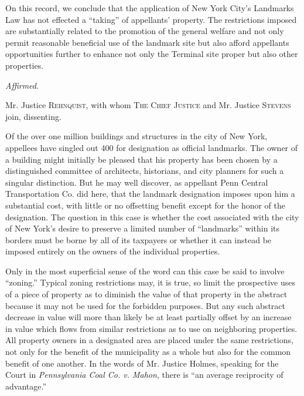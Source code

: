 %
On this record, we conclude that the application of New York City's Landmarks
Law has not effected a ``taking'' of appellants' property. The restrictions
imposed are substantially related to the promotion of the general welfare and
not only permit reasonable beneficial use of the landmark site but also afford
appellants opportunities further to enhance not only the Terminal site proper
but also other properties.

\textit{Affirmed}.

\opinion Mr. Justice \textsc{Rehnquist}, with whom \textsc{The Chief Justice}
and Mr. Justice \textsc{Stevens} join, dissenting.

Of the over one million buildings and structures in the city of New York,
appellees have singled out 400 for designation as official landmarks. The owner
of a building might initially be pleased that his property has been chosen by a
distinguished committee of architects, historians, and city planners for such a
singular distinction. But he may well discover, as appellant Penn Central
Transportation Co. did here, that the landmark designation imposes upon him a
substantial cost, with little or no offsetting benefit except for the honor of
the designation. The question in this case is whether the cost associated with
the city of New York's desire to preserve a limited number of ``landmarks''
within its borders must be borne by all of its taxpayers or whether it can
instead be imposed entirely on the owners of the individual properties.

Only in the most superficial sense of the word can this case be said to involve
``zoning.'' Typical zoning restrictions may, it is true, so limit the
prospective uses of a piece of property as to diminish the value of that
property in the abstract because it may not be used for the forbidden purposes.
But any such abstract decrease in value will more than likely be at least
partially offset by an increase in value which flows from similar restrictions
as to use on neighboring properties. All property owners in a designated area
are placed under the same restrictions, not only for the benefit of the
municipality as a whole but also for the common benefit of one another. In the
words of Mr. Justice Holmes, speaking for the Court in \textit{Pennsylvania Coal
Co. v. Mahon}, there is ``an average reciprocity of advantage.''

